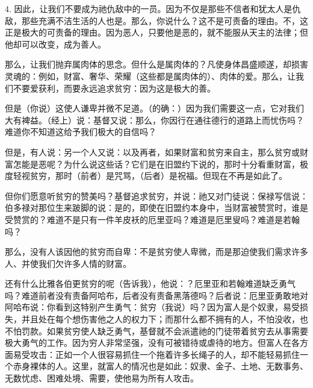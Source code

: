 4. 因此，让我们不要成为祂仇敌中的一员。因为不仅是那些不信者和犹太人是仇敌，那些充满不洁生活的人也是。那么，你说什么？这不是可责备的理由。不，这正是极大的可责备的理由。因为恶人，只要他是恶的，就不能服从天主的法律；但他却可以改变，成为善人。\par

那么，让我们抛弃属肉体的思念。但什么是属肉体的？凡使身体昌盛顺遂，却损害灵魂的：例如，财富、奢华、荣耀（这些都是属肉体的）、肉体的爱。那么，让我们不要爱获利，而要永远追求贫穷：因为这是极大的善。\par

但是（你说）这使人谦卑并微不足道。（的确：）因为我们需要这一点，它对我们大有裨益。（经上）说：基督又说：那么，你因行在通往德行的道路上而忧伤吗？难道你不知道这给予我们极大的自信吗？\par

但是，有人说：另一个人又说：以及再者，如果财富和贫穷来自主，那么贫穷或财富怎能是恶呢？为什么说这些话？它们是在旧盟约下说的，那时十分看重财富，极度轻视贫穷，那时（前者）是咒骂，（后者）是祝福。但现在不再是如此了。\par

但你们愿意听贫穷的赞美吗？基督追求贫穷，并说：祂又对门徒说：保禄写信说：伯多禄对那位生来跛脚的说：是的，即使在旧盟约本身中，当财富被赞赏时，谁是受赞赏的？难道不是只有一件羊皮袄的厄里亚吗？难道是厄里叟吗？难道是若翰吗？\par

那么，没有人该因他的贫穷而自卑：不是贫穷使人卑微，而是那迫使我们需求许多人、并使我们欠许多人情的财富。\par

还有什么比雅各伯更贫穷的呢（告诉我），他说：？厄里亚和若翰难道缺乏勇气吗？难道前者没有责备阿哈布，后者没有责备黑落德吗？后者说：厄里亚勇敢地对阿哈布说：你看到这特别产生勇气：贫穷（我说）吗？因为富人是个奴隶，易受损失，并且处在每个想伤害他之人的权力下；而那什么都不拥有的人，不怕没收，也不怕罚款。如果贫穷使人缺乏勇气，基督就不会派遣祂的门徒带着贫穷去从事需要极大勇气的工作。因为穷人非常坚强，没有可被错待或虐待的地方。但富人在各方面易受攻击：正如一个人很容易抓住一个拖着许多长绳子的人，却不能轻易抓住一个赤身裸体的人。这里，就富人的情况也是如此：奴隶、金子、土地、无数事务、无数忧虑、困难处境、需要，使他易为所有人攻击。\par

